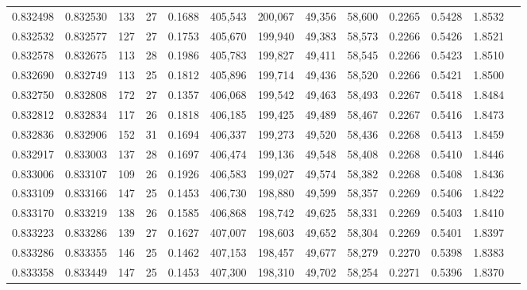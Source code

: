 \begin{tabular}{rrrrrrrrrrrrr}
0.832498 & 0.832530 &   133 &  27 &                                     0.1688 & 405,543 & 200,067 &  49,356 &  58,600 & 0.2265 & 0.5428 & 1.8532 \\
0.832532 & 0.832577 &   127 &  27 &                                     0.1753 & 405,670 & 199,940 &  49,383 &  58,573 & 0.2266 & 0.5426 & 1.8521 \\
0.832578 & 0.832675 &   113 &  28 &                                     0.1986 & 405,783 & 199,827 &  49,411 &  58,545 & 0.2266 & 0.5423 & 1.8510 \\
0.832690 & 0.832749 &   113 &  25 &                                     0.1812 & 405,896 & 199,714 &  49,436 &  58,520 & 0.2266 & 0.5421 & 1.8500 \\
0.832750 & 0.832808 &   172 &  27 &                                     0.1357 & 406,068 & 199,542 &  49,463 &  58,493 & 0.2267 & 0.5418 & 1.8484 \\
0.832812 & 0.832834 &   117 &  26 &                                     0.1818 & 406,185 & 199,425 &  49,489 &  58,467 & 0.2267 & 0.5416 & 1.8473 \\
0.832836 & 0.832906 &   152 &  31 &                                     0.1694 & 406,337 & 199,273 &  49,520 &  58,436 & 0.2268 & 0.5413 & 1.8459 \\
0.832917 & 0.833003 &   137 &  28 &                                     0.1697 & 406,474 & 199,136 &  49,548 &  58,408 & 0.2268 & 0.5410 & 1.8446 \\
0.833006 & 0.833107 &   109 &  26 &                                     0.1926 & 406,583 & 199,027 &  49,574 &  58,382 & 0.2268 & 0.5408 & 1.8436 \\
0.833109 & 0.833166 &   147 &  25 &                                     0.1453 & 406,730 & 198,880 &  49,599 &  58,357 & 0.2269 & 0.5406 & 1.8422 \\
0.833170 & 0.833219 &   138 &  26 &                                     0.1585 & 406,868 & 198,742 &  49,625 &  58,331 & 0.2269 & 0.5403 & 1.8410 \\
0.833223 & 0.833286 &   139 &  27 &                                     0.1627 & 407,007 & 198,603 &  49,652 &  58,304 & 0.2269 & 0.5401 & 1.8397 \\
0.833286 & 0.833355 &   146 &  25 &                                     0.1462 & 407,153 & 198,457 &  49,677 &  58,279 & 0.2270 & 0.5398 & 1.8383 \\
0.833358 & 0.833449 &   147 &  25 &                                     0.1453 & 407,300 & 198,310 &  49,702 &  58,254 & 0.2271 & 0.5396 & 1.8370 \\

\end{tabular}
